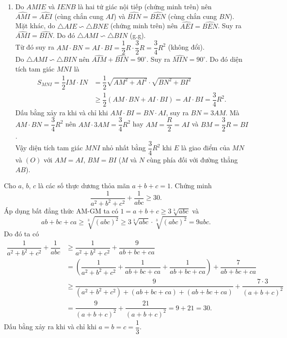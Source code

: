 \begin{bt}
{\begin{enumerate}
	Từ $(1)$ và $(2)$ suy ra $\triangle AIE\backsim \triangle BNE$ (g.g). Do đó $AI\cdot NE=IE\cdot NB$. Mặt khác do $I$ là trung điểm của $AO$ nên $AI=\dfrac{1}{3}IB$. Từ đó suy ra $\dfrac{1}{3}IB\cdot NE=IE\cdot NB$ hay $IB\cdot NE=3\cdot IE\cdot NB$.
	\item Do $AMIE$ và $IENB$ là hai tứ giác nội tiếp (chứng minh trên) nên $\widehat{AMI}=\widehat{AEI}$ (cùng chắn cung $AI$) và $\widehat{BIN}=\widehat{BEN}$ (cùng chắn cung $BN$).\\ Mặt khác, do $\triangle AIE\backsim \triangle BNE$ (chứng minh trên) nên $\widehat{AEI}=\widehat{BEN}$. Suy ra $\widehat{AMI}=\widehat{BIN}$. Do đó $\triangle AMI\backsim \triangle BIN$ (g.g).\\ Từ đó suy ra $AM\cdot BN=AI\cdot BI=\dfrac{1}{2}R\cdot \dfrac{3}{2}R=\dfrac{3}{4}R^2$ (không đổi).\\
Do $\triangle AMI\backsim \triangle BIN$ nên $\widehat{AIM}+\widehat{BIN}=90^\circ$. Suy ra $\widehat{MIN}=90^\circ$. Do đó diện tích tam giác $MNI$ là  $$\begin{aligned}
S_{MNI}=\dfrac{1}{2}IM\cdot IN&=\dfrac{1}{2}\sqrt{AM^2+AI^2}\cdot \sqrt{BN^2+BI^2}\\ 
&\ge \dfrac{1}{2}(AM\cdot BN+AI\cdot BI)=AI\cdot BI=\dfrac{3}{4}R^2.
\end{aligned}$$
Dấu bằng xảy ra khi và chỉ khi $AM\cdot BI=BN\cdot AI$, suy ra $BN=3AM$. Mà $AM\cdot BN=\dfrac{3}{4}R^2$ nên $AM\cdot 3AM=\dfrac{3}{4}R^2$ hay $AM=\dfrac{R}{2}=AI$ và $BM=\dfrac{3}{2}R=BI$.\\
Vậy diện tích tam giác $MNI$ nhỏ nhất bằng $\dfrac{3}{4}R^2$ khi $E$ là giao điểm của $MN$ và $(O)$ với $AM=AI$, $BM=BI$ ($M$ và $N$ cùng phía đối với đường thẳng $AB$).
	\end{enumerate}}
\end{bt}
\begin{bt}%
	Cho  $a$, $b$, $c$ là các số thực dương thỏa mãn $a+b+c=1$. Chứng minh $$\dfrac{1}{a^2+b^2+c^2}+\dfrac{1}{abc}\ge 30.$$
	\loigiai
	{
Áp dụng bất đẳng thức AM-GM ta có $1=a+b+c\ge 3\sqrt[3]{abc}$ và $$ab+bc+ca\ge \sqrt[3]{(abc)^2}\ge 3\sqrt[3]{abc}\cdot \sqrt[3]{(abc)^2}=9abc.$$		
Do đó ta có
{\allowdisplaybreaks	\begin{align*}
\dfrac{1}{a^2+b^2+c^2}+\dfrac{1}{abc}&\ge \dfrac{1}{a^2+b^2+c^2}+\dfrac{9}{ab+bc+ca}\\ 
&=\left(\dfrac{1}{a^2+b^2+c^2}+\dfrac{1}{ab+bc+ca}+\dfrac{1}{ab+bc+ca}\right)+\dfrac{7}{ab+bc+ca}\\
&\ge \dfrac{9}{(a^2+b^2+c^2)+(ab+bc+ca)+(ab+bc+ca)}+\dfrac{7\cdot 3}{(a+b+c)^2}\\
&=\dfrac{9}{(a+b+c)^2}+\dfrac{21}{(a+b+c)^2}=9+21=30.
\end{align*}}
Dấu bằng xảy ra khi và chỉ khi $a=b=c=\dfrac{1}{3}$.
}
\end{bt}
